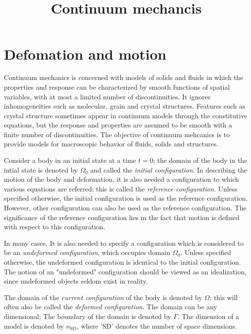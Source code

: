 \documentclass[conference]{IEEEtran}
\theoremstyle{definition}
\theoremstyle{remark}
\begin{document}
    \title{Continuum mechancis}

    \author{}

    \maketitle

    \section{Defomation and motion}
    Continuum mechanics is concerned with models of solids and fluids in which the properties and response can be characterized by smooth functions of spatial variables, with at most a limited number of discontinuities. It ignores inhomogeneities such as molecular, grain and crystal structures. Features such as crystal structure sometimes appear in continuum models through the constitutive equations, but the response and properties are assumed to be smooth with a finite number of discontinuities. The objective of continuum mehcanics is to provide models for macroscopic behavior of fluids, solids and structures.

    Consider a body in an initial state at a time $t = 0$; the domain of the body in the intial state is denoted by $\Omega_0$ and called the \emph{initial configuration}. In describing the motion of the body and deformation, it is also needed a configuration to which various equations are referred; this is called the \emph{reference configuration}. Unless specified otherwise, the initial configuration is used as the reference configuration. However, other configuration can also be used as the reference configuration. The significance of the reference configuration lies in the fact that motion is defined with respect to this configuration.

    In many cases, It is also needed to specify a configuration which is considered to be an \emph{undeformed configuration}, which occupies domain $\Omega_0$. Unless specified otherwise, the undeformed configuration is identical to the initial configuration. The notion of an "undeformed" configuration should be viewed as an idealization, since undeformed objects seldom exist in reality. 
    
    The domain of the \emph{current configuration} of the body is denoted by $\Omega$; this will often also be called the \emph{deformed configuration}. The domain can be any dimensional; The boundary of the domain is denoted by $\Gamma$. The dimension of a model is denoted by $n_{\mathrm{SD}}$, where 'SD' denotes the number of space dimensions.
\end{document}
